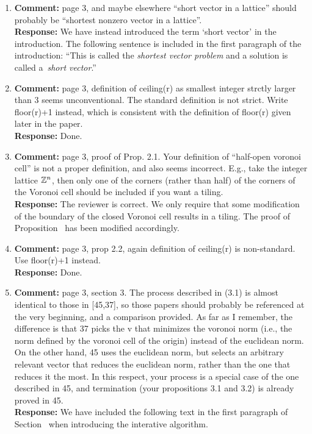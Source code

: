 \documentclass[a4paper,10pt]{article}
\begin{document}
\begin{enumerate}
\item\textbf{Comment:}  
page 3, and maybe elsewhere ``short vector in a lattice'' should probably be ``shortest nonzero vector in a lattice''. 
\\\textbf{Response:}
We have instead introduced the term `short vector' in the introduction.  The following sentence is included in the first paragraph of the introduction: ``This is called the \emph{shortest vector problem} and a solution is called a~\emph{short vector}.''

\item\textbf{Comment:}  
page 3, definition of ceiling(r) as smallest integer strctly larger than 3 seems unconventional. The standard definition is not strict. Write floor(r)+1 instead, which is consistent with the definition of floor(r) given later in the paper. 
\\\textbf{Response:}
Done.

\item\textbf{Comment:}  \label{com:rev2halfopen}
page 3, proof of Prop. 2.1. Your definition of ``half-open voronoi cell'' is not a proper definition, and also seems incorrect. E.g., take the integer lattice ${\mathbb Z}^n$, then only one of the corners (rather than half) of the corners of the Voronoi cell should be included if you want a tiling. 
\\\textbf{Response:}
The reviewer is correct.  We only require that some modification of the boundary of the closed Voronoi cell results in a tiling.  The proof of Proposition~ has been modified accordingly.

\item\textbf{Comment:}  
page 3, prop 2.2, again definition of ceiling(r) is non-standard. Use floor(r)+1 instead. 
\\\textbf{Response:}
Done. 

\item\textbf{Comment:}  
page 3, section 3. 
The process described in (3.1) is almost identical to those in [45,37], so those papers should probably be referenced at the very beginning, and a comparison provided. As far as I remember, the difference is that 37 picks the v that minimizes the voronoi norm (i.e., the norm defined by the voronoi cell of the origin) instead of the euclidean norm. On the other hand, 45 uses the euclidean norm, but selects an arbitrary relevant vector that reduces the euclidean norm, rather than the one that reduces it the most. In this respect, your process is a special case of the one described in 45, and termination (your propositions 3.1 and 3.2) is already proved in 45. 
\\\textbf{Response:}
We have included the following text in the first paragraph of Section~ when introducing the interative algorithm.


\end{enumerate}
\end{document}
